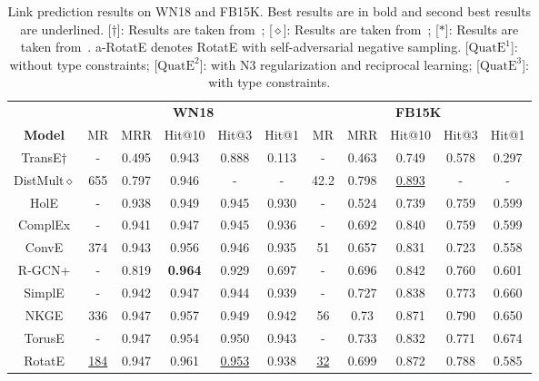 \documentclass{article}
\begin{document}
\begin{table}[t]
\small
\centering
\caption{Link prediction results on WN18 and FB15K. Best results are in bold and second best results are underlined. [$\dagger$]: Results are taken from~\citep{nickel2016holographic}; [$\diamond$]: Results are taken from~\citep{kadlec2017knowledge}; [$\ast$]: Results are taken from~\citep{sun2019rotate}. a-RotatE denotes RotatE with self-adversarial negative sampling. [$\text{QuatE}^1$]: without type constraints; [$\text{QuatE}^2$]: with N3 regularization and reciprocal learning; [$\text{QuatE}^3$]: with type constraints.}
\begin{tabular}{ccccccccccc}
\toprule
               & \multicolumn{5}{c}{\textbf{WN18}}   & \multicolumn{5}{c}{\textbf{FB15K}} \\
\textbf{Model} & MR  & MRR   & Hit@10 & Hit@3 & Hit@1 & MR & MRR   & Hit@10 & Hit@3 & Hit@1 \\
              \midrule
TransE$\dagger$        & -   & 0.495 & 0.943  & 0.888 & 0.113 & -  & 0.463 & 0.749  & 0.578 & 0.297 \\
DistMult$\diamond$      &655 & 0.797 & 0.946     & -    & -  & 42.2 & 0.798 & \underline{0.893}  & - & - \\
HolE           & -   & 0.938 & 0.949  & 0.945 & 0.930 & -  & 0.524 & 0.739  & 0.759 & 0.599 \\
ComplEx       & -   & 0.941 & 0.947  & 0.945 & 0.936 & -  &0.692 & 0.840  &0.759 & 0.599\\
ConvE          & 374 & 0.943 & 0.956  & 0.946 & 0.935 & 51 & 0.657 & 0.831  & 0.723 & 0.558 \\
R-GCN+         & - & 0.819 &\textbf{ 0.964 }& 0.929 & 0.697 & - & 0.696 &  0.842 & 0.760 & 0.601 \\
SimplE & - & 0.942 & 0.947 & 0.944 & 0.939 & - & 0.727 & 0.838 & 0.773 & 0.660 \\
NKGE &  336 & 0.947  & 0.957   & 0.949& 0.942  & 56  & 0.73  &  0.871 & 0.790  & 0.650\\
TorusE &-&0.947&0.954&0.950& 0.943& - & 0.733 &0.832& 0.771& 0.674 \\
RotatE         & \underline{184} &  0.947 & 0.961 &  \underline{0.953} & 0.938 & \underline{32} & 0.699 & 0.872  & 0.788 &  0.585 \\


\end{tabular}
\end{table}
\end{document}
